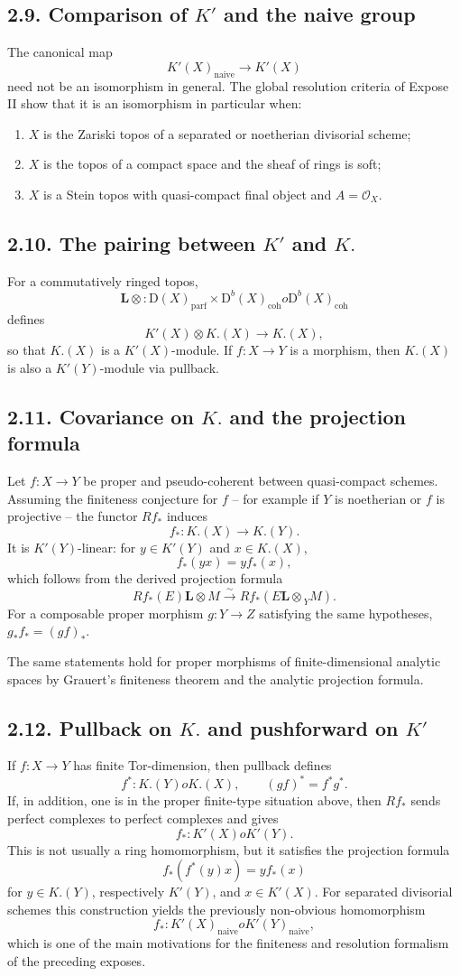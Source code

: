 \documentclass[13pt]{extarticle}
\newcommand{\cO}{\mathcal O}
\newcommand{\D}{\mathrm D}
\newcommand{\Ltens}{\mathbin{\mathbf L\!\otimes}}
\newcommand{\iso}{\xrightarrow{\sim}}
\begin{document}
\subsection*{2.9. Comparison of $K'$ and the naive group}
The canonical map
\[
K'(X)_{\mathrm{naive}}\to K'(X)
\]
need not be an isomorphism in general. The global resolution criteria of Expose II show that it is an isomorphism in particular when:
\begin{enumerate}[label=(\roman*)]
\item $X$ is the Zariski topos of a separated or noetherian divisorial scheme;
\item $X$ is the topos of a compact space and the sheaf of rings is soft;
\item $X$ is a Stein topos with quasi-compact final object and $A=\cO_X$.
\end{enumerate}

\subsection*{2.10. The pairing between $K'$ and $K.$}
For a commutatively ringed topos,
\[
\Ltens: \D(X)_{\mathrm{parf}}\times\D^b(X)_{\mathrm{coh}}	o\D^b(X)_{\mathrm{coh}}
\]
defines
\[
K'(X)\otimes K.(X)\to K.(X),
\]
so that $K.(X)$ is a $K'(X)$-module. If $f:X\to Y$ is a morphism, then $K.(X)$ is also a $K'(Y)$-module via pullback.

\subsection*{2.11. Covariance on $K.$ and the projection formula}
Let $f:X\to Y$ be proper and pseudo-coherent between quasi-compact schemes. Assuming the finiteness conjecture for $f$ -- for example if $Y$ is noetherian or $f$ is projective -- the functor $Rf_*$ induces
\[
f_*:K.(X)\to K.(Y).
\]
It is $K'(Y)$-linear: for $y\in K'(Y)$ and $x\in K.(X)$,
\[
f_*(yx)=y f_*(x),
\]
which follows from the derived projection formula
\[
Rf_*(E)\Ltens M\iso Rf_*(E\Ltens_Y M).
\]
For a composable proper morphism $g:Y\to Z$ satisfying the same hypotheses, $g_*f_*=(gf)_*$.

The same statements hold for proper morphisms of finite-dimensional analytic spaces by Grauert's finiteness theorem and the analytic projection formula.

\subsection*{2.12. Pullback on $K.$ and pushforward on $K'$}
If $f:X\to Y$ has finite Tor-dimension, then pullback defines
\[
f^*:K.(Y)	o K.(X),
\qquad
(gf)^*=f^*g^*.
\]
If, in addition, one is in the proper finite-type situation above, then $Rf_*$ sends perfect complexes to perfect complexes and gives
\[
f_*:K'(X)	o K'(Y).
\]
This is not usually a ring homomorphism, but it satisfies the projection formula
\[
f_*(f^*(y)x)=y f_*(x)
\]
for $y\in K.(Y)$, respectively $K'(Y)$, and $x\in K'(X)$. For separated divisorial schemes this construction yields the previously non-obvious homomorphism
\[
f_*:K'(X)_{\mathrm{naive}}	o K'(Y)_{\mathrm{naive}},
\]
which is one of the main motivations for the finiteness and resolution formalism of the preceding exposes.
\end{document}
